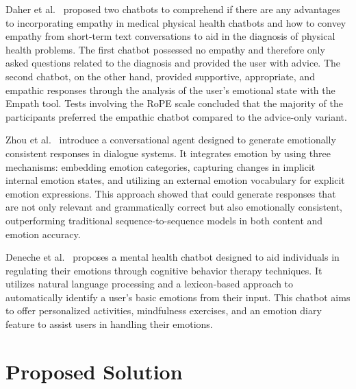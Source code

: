 \documentclass[runningheads]{llncs}
\begin{document}
Daher et al.~\cite{daher_empathic_nodate} proposed two chatbots to comprehend if there are any advantages to incorporating empathy in medical physical health chatbots and how to convey empathy from short-term text conversations to aid in the diagnosis of physical health problems. The first chatbot possessed no empathy and therefore only asked questions related to the diagnosis and provided the user with advice. The second chatbot, on the other hand, provided supportive, appropriate, and empathic responses through the analysis of the user's emotional state with the Empath tool. Tests involving the RoPE scale concluded that the majority of the participants preferred the empathic chatbot compared to the advice-only variant.

Zhou et al.~\cite{Zhou2018} introduce a conversational agent designed to generate emotionally consistent responses in dialogue systems. It integrates emotion by using three mechanisms: embedding emotion categories, capturing changes in implicit internal emotion states, and utilizing an external emotion vocabulary for explicit emotion expressions. This approach showed that could generate responses that are not only relevant and grammatically correct but also emotionally consistent, outperforming traditional sequence-to-sequence models in both content and emotion accuracy.

Deneche et al.~\cite{Denecke2021} proposes a mental health chatbot designed to aid individuals in regulating their emotions through cognitive behavior therapy techniques. It utilizes natural language processing and a lexicon-based approach to automatically identify a user's basic emotions from their input. This chatbot aims to offer personalized activities, mindfulness exercises, and an emotion diary feature to assist users in handling their emotions.

\section{Proposed Solution}
\label{sec:solution}
\end{document}
